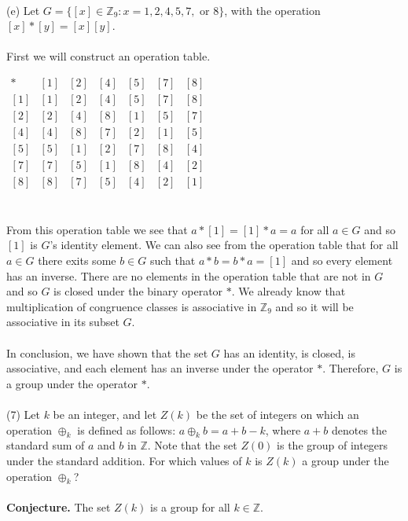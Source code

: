 \documentclass[11pt,a4paper]{article}
\begin{document}
~\\
(e) Let $G = \{[x] \in \mathbb{Z}_9 : x = 1, 2, 4, 5, 7, \text{ or } 8\}$, with the operation $[x] *
[y] = [x][y]$.\\
~\\
First we will construct an operation table.
\begin{center}
$
\begin{array}{c|c|c|c|c|c|c}
* & [1] & [2] & [4] & [5] & [7] & [8]\\\hline
[1] & [1] & [2] & [4] & [5] & [7] & [8]\\\hline
[2] & [2] & [4] & [8] & [1] & [5] & [7]\\\hline
[4] & [4] & [8] & [7] & [2] & [1] & [5]\\\hline
[5] & [5] & [1] & [2] & [7] & [8] & [4]\\\hline
[7] & [7] & [5] & [1] & [8] & [4] & [2]\\\hline
[8] & [8] & [7] & [5] & [4] & [2] & [1]\\
\end{array}
$
\end{center}
~\\
From this operation table we see that $a*[1] = [1]*a = a$ for all $a\in G$ and so $[1]$ is $G$'s identity element. We can also see from the operation table that for all $a \in G$ there exits some $b\in G$ such that $a*b = b*a = [1]$ and so every element has an inverse. There are no elements in the operation table that are not in $G$ and so $G$ is closed under the binary operator $*$. We already know that multiplication of congruence classes is associative in $\mathbb{Z}_9$ and so it will be associative in its subset $G$.\\
~\\
In conclusion, we have shown that the set $G$ has an identity, is closed, is associative, and each element has an inverse under the operator $*$. Therefore, $G$ is a group under the operator $*$.\\
~\\
(7) Let $k$ be an integer, and let $Z(k)$ be the set of integers on which an operation
$\oplus_k$ is defined as follows:
$a \oplus_k b = a + b - k$, where $a + b$ denotes the standard sum of $a$ and $b$ in $\mathbb{Z}$. Note that the set $Z(0)$ is the group of integers under the standard addition. For which values of $k$ is $Z(k)$ a group under the operation $\oplus_k$?\\
~\\
{\bf Conjecture.} The set $Z(k)$ is a group for all $k\in \mathbb{Z}$.\\
\end{document}
